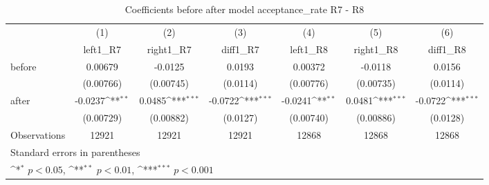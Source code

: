 \begin{table}[!ht]\centering \footnotesize
\def\sym#1{\ifmmode^{#1}\else\(^{#1}\)\fi}
\caption{Coefficients before after model acceptance\_rate R7 - R8}
\begin{tabular}{l*{6}{c}}
\hline\hline
                    &\multicolumn{1}{c}{(1)}&\multicolumn{1}{c}{(2)}&\multicolumn{1}{c}{(3)}&\multicolumn{1}{c}{(4)}&\multicolumn{1}{c}{(5)}&\multicolumn{1}{c}{(6)}\\
                    &\multicolumn{1}{c}{left1\_R7}&\multicolumn{1}{c}{right1\_R7}&\multicolumn{1}{c}{diff1\_R7}&\multicolumn{1}{c}{left1\_R8}&\multicolumn{1}{c}{right1\_R8}&\multicolumn{1}{c}{diff1\_R8}\\
\hline
before              &     0.00679         &     -0.0125         &      0.0193         &     0.00372         &     -0.0118         &      0.0156         \\
                    &   (0.00766)         &   (0.00745)         &    (0.0114)         &   (0.00776)         &   (0.00735)         &    (0.0114)         \\
[1em]
after               &     -0.0237\sym{**} &      0.0485\sym{***}&     -0.0722\sym{***}&     -0.0241\sym{**} &      0.0481\sym{***}&     -0.0722\sym{***}\\
                    &   (0.00729)         &   (0.00882)         &    (0.0127)         &   (0.00740)         &   (0.00886)         &    (0.0128)         \\
\hline
Observations        &       12921         &       12921         &       12921         &       12868         &       12868         &       12868         \\
\hline\hline
\multicolumn{7}{l}{\footnotesize Standard errors in parentheses}\\
\multicolumn{7}{l}{\footnotesize \sym{*} \(p<0.05\), \sym{**} \(p<0.01\), \sym{***} \(p<0.001\)}\\
\end{tabular}
\end{table}
